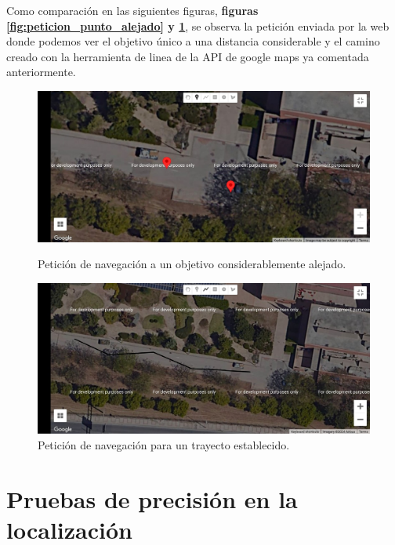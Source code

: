 Como comparación en las siguientes figuras, \textbf{figuras \ref{fig:peticion_punto_alejado} y \ref{fig:peticion_camino}}, se observa la petición enviada por la web donde podemos ver el objetivo único a una distancia considerable y el 
camino creado con la herramienta de linea de la API de google maps ya comentada anteriormente.


\begin{figure}[htbp]
  \centering
  \begin{minipage}[b]{0.45\textwidth}
    \centering
    \includegraphics[width=\textwidth]{images/punto_inter_web.jpeg}
    \caption{Petición de navegación a un objetivo considerablemente alejado.}
    \label{fig:peticion_punto_alejado}
  \end{minipage}
  \hfill
  \begin{minipage}[b]{0.45\textwidth}
    \centering
    \includegraphics[width=\textwidth]{images/camino_inter_web.jpeg}
    \caption{Petición de navegación para un trayecto establecido.}
    \label{fig:peticion_camino}
  \end{minipage}
\end{figure}


\section{Pruebas de precisión en la localización}

